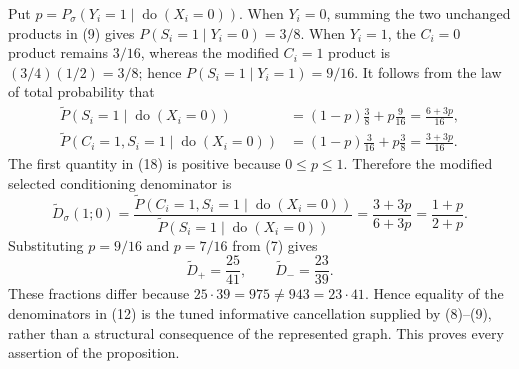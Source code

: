 Put \(p=P_\sigma(Y_i=1\mid\operatorname{do}(X_i=0))\).  When \(Y_i=0\), summing the two unchanged products in (9) gives \(P(S_i=1\mid Y_i=0)=3/8\).  When \(Y_i=1\), the \(C_i=0\) product remains \(3/16\), whereas the modified \(C_i=1\) product is \((3/4)(1/2)=3/8\); hence \(P(S_i=1\mid Y_i=1)=9/16\).  It follows from the law of total probability that
\[
\begin{aligned}
 \widetilde P(S_i=1\mid\operatorname{do}(X_i=0))
 &=(1-p)\frac38+p\frac9{16}=\frac{6+3p}{16},\\
 \widetilde P(C_i=1,S_i=1\mid\operatorname{do}(X_i=0))
 &=(1-p)\frac3{16}+p\frac38=\frac{3+3p}{16}.            \tag{18}
\end{aligned}
\]
The first quantity in (18) is positive because \(0\le p\le1\).  Therefore the modified selected conditioning denominator is
\[
 \widetilde D_\sigma(1;0)
 =\frac{\widetilde P(C_i=1,S_i=1\mid\operatorname{do}(X_i=0))}
        {\widetilde P(S_i=1\mid\operatorname{do}(X_i=0))}
 =\frac{3+3p}{6+3p}=\frac{1+p}{2+p}.                    \tag{19}
\]
Substituting \(p=9/16\) and \(p=7/16\) from (7) gives
\[
 \widetilde D_+=\frac{25}{41},
 \qquad
 \widetilde D_-=\frac{23}{39}.                         \tag{20}
\]
These fractions differ because \(25\cdot39=975\ne943=23\cdot41\).  Hence equality of the denominators in (12) is the tuned informative cancellation supplied by (8)--(9), rather than a structural consequence of the represented graph.  This proves every assertion of the proposition.
